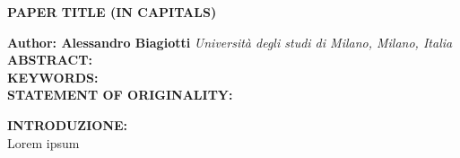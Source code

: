 \documentclass[a4paper,10pt]{article}
\begin{document}
\noindent
\begin{center}
	\textbf{{\Large PAPER TITLE (IN CAPITALS)}} \\
\end{center}

\noindent
\textbf{Author: Alessandro Biagiotti} \hfill \textit{Università degli studi di Milano, Milano, Italia}
\\


\noindent
\textbf{ABSTRACT:}
\\

\noindent
\textbf{KEYWORDS:}
\\

\noindent
\textbf{STATEMENT OF ORIGINALITY:}

\noindent
{}
\makeatletter\def\@currentlabel{\texttt{(I)}}\makeatother
\label{sec:intro}
\textbf{INTRODUZIONE:}
\\
Lorem ipsum



\clearpage
\end{document}
